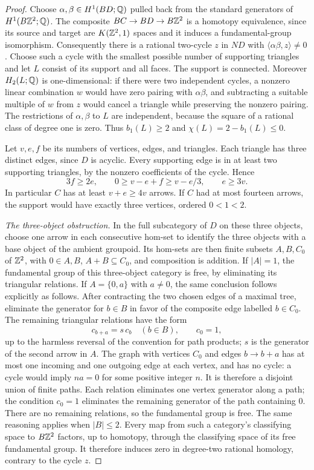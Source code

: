 \begin{proof}
Choose $\alpha,\beta\in H^1(BD;\mathbb Q)$ pulled back from the standard
generators of $H^1(B\mathbb Z^2;\mathbb Q)$. The composite
$BC\to BD\to B\mathbb Z^2$ is a homotopy equivalence, since its source
and target are $K(\mathbb Z^2,1)$ spaces and it induces a fundamental-group
isomorphism. Consequently there is a rational two-cycle $z$ in
$ND$ with $\langle\alpha\beta,z\rangle\ne0$.
Choose such a cycle with the smallest possible number of supporting
triangles and let $L$ consist of its support and all faces.
The support is connected. Moreover $H_2(L;\mathbb Q)$ is one-dimensional:
if there were two independent cycles, a nonzero linear combination
$w$ would have zero pairing with $\alpha\beta$, and subtracting
a suitable multiple of $w$ from $z$ would cancel a triangle while
preserving the nonzero pairing. The restrictions of $\alpha,\beta$
to $L$ are independent, because the square of a rational class
of degree one is zero. Thus $b_1(L)\ge2$ and
$\chi(L)=2-b_1(L)\le0$.

Let $v,e,f$ be its numbers of vertices, edges, and triangles.
Each triangle has three distinct edges, since $D$ is acyclic.
Every supporting edge is in at least two supporting triangles, by
the nonzero coefficients of the cycle. Hence
\[
 3f\ge2e,\qquad 0\ge v-e+f\ge v-e/3,
 \qquad e\ge3v.
\]
In particular $C$ has at least $v+e\ge4v$ arrows.
If $C$ had at most fourteen arrows, the support would have exactly
three vertices, ordered $0<1<2$.

\emph{The three-object obstruction.}
In the full subcategory of $D$ on these three objects, choose
one arrow in each consecutive hom-set to identify the three objects
with a base object of the ambient groupoid. Its hom-sets are then
finite subsets $A,B,C_0$ of $\mathbb Z^2$, with $0\in A,B$,
$A+B\subseteq C_0$, and composition is addition.
If $|A|=1$, the fundamental group of this three-object category is
free, by eliminating its triangular relations. If $A=\{0,a\}$
with $a\ne0$, the same conclusion follows explicitly as follows.
After contracting the two chosen edges of a maximal tree, eliminate
the generator for $b\in B$ in favor of the composite edge labelled
$b\in C_0$. The remaining triangular relations have the form
\[
 c_{b+a}=s\,c_b\quad(b\in B),\qquad c_0=1,
\]
up to the harmless reversal of the convention for path products;
$s$ is the generator of the second arrow in $A$.
The graph with vertices $C_0$ and edges $b\to b+a$ has at most
one incoming and one outgoing edge at each vertex, and has no cycle:
a cycle would imply $na=0$ for some positive integer $n$.
It is therefore a disjoint union of finite paths. Each relation
eliminates one vertex generator along a path; the condition $c_0=1$
eliminates the remaining generator of the path containing $0$.
There are no remaining relations, so the fundamental group is free.
The same reasoning applies when $|B|\le2$.
Every map from such a category's classifying space to $B\mathbb Z^2$
factors, up to homotopy, through the classifying space of its free
fundamental group. It therefore induces zero in degree-two rational
homology, contrary to the cycle $z$.


\end{proof}
